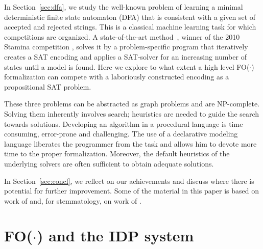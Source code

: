 \documentclass{tlp}
\newcommand{\idp}{{\sc IDP}\xspace}
\newcommand{\fodot}{{\sc FO($\cdot$)}\xspace}
\renewcommand{\|}{\ensuremath{\,|\,}}
\renewcommand{\|}{\,|\,}
\begin{document}
In Section~\ref{sec:dfa}, we study the well-known problem of learning
a minimal deterministic finite state automaton (DFA) that is
consistent with a given set of accepted and rejected strings. This is
a classical machine learning task for which competitions are
organized. A state-of-the-art method~\cite{Verwer,Verwer12}, winner of
the 2010 Stamina competition \cite{stamina}, solves it by a
problem-specific program that iteratively creates a SAT encoding and
applies a SAT-solver for an increasing number of states until a model
is found.
Here we explore to what extent a high  level \fodot formalization
can compete with a laboriously constructed encoding as a propositional
SAT problem.


These three problems can be abstracted as graph problems and are
NP-complete. Solving them inherently involves search; heuristics
are needed to guide the search towards solutions. Developing an
algorithm in a procedural language is time consuming, error-prone and
challenging. The use of a declarative modeling language liberates the
programmer from the task and allows him to devote more time to the
proper formalization. Moreover, the default heuristics of the
underlying solvers are often sufficient to obtain adequate solutions.

In Section~\ref{sec:concl}, we reflect on our achievements and discuss
where there is potential for further improvement.  Some of the
material in this paper is based on work of  and,
for stemmatology, on  work of .


\section{\fodot and the \idp system}\label{sec:fodot}
\end{document}
